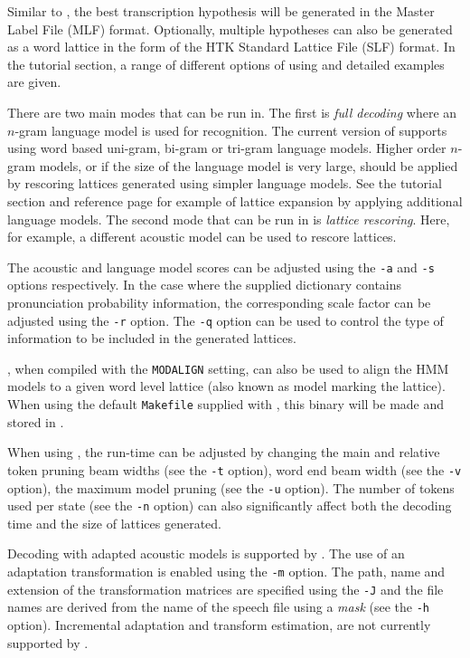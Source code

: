 Similar to , the best transcription hypothesis will be generated
in the Master Label File (MLF) format. Optionally, multiple hypotheses can
also be generated as a word lattice in the form of the HTK Standard Lattice
File (SLF) format. In the  tutorial section, a range of
different options of using  and detailed examples are given.

There are two main modes that  can be run in. The first is
\emph{full decoding} where an $n$-gram language model is used for recognition.
The current version of  supports using word based uni-gram,
bi-gram or tri-gram language models. Higher order $n$-gram models, or if the
size of the language model is very large, should be applied by rescoring
lattices generated using simpler language models. See the 
tutorial section and  reference page for example of lattice
expansion by applying additional language models. The second mode that
 can be run in is \emph{lattice rescoring}. Here, for example,
a different acoustic model can be used to rescore lattices.

The acoustic and language model scores can be adjusted using the
\texttt{-a} and \texttt{-s} options respectively. 
In the case where the supplied dictionary
contains pronunciation probability information, the corresponding scale
factor can be adjusted using the \texttt{-r} option. The \texttt{-q} option
can be used to control the type of information to be included in the
generated lattices. 

, when compiled with the \texttt{MODALIGN} setting,
can also be used to align the HMM models to a given word level lattice
(also known as model marking the lattice). When using the default
\texttt{Makefile} supplied with , this binary will be
made and stored in . 

When using , the run-time can be adjusted by changing the main
and relative token pruning beam widths (see the \texttt{-t} option), word end
beam width (see the \texttt{-v} option), the maximum model pruning (see the
\texttt{-u} option). The number of tokens used per state (see the \texttt{-n}
option) can also significantly affect both the decoding time and the size of
lattices generated.

Decoding with adapted acoustic models is supported by . The use
of an adaptation transformation is enabled using the \texttt{-m} option.  The
path, name and extension of the transformation matrices are specified using
the \texttt{-J} and the file names are derived from the name of the speech
file using a \emph{mask} (see the \texttt{-h} option).  Incremental adaptation
and transform estimation, are not currently supported by .


